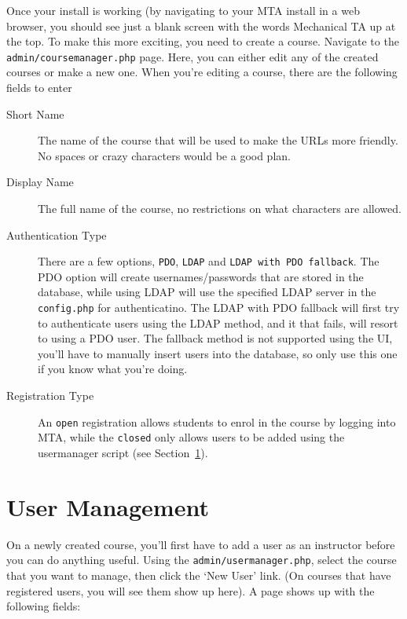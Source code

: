 \documentclass[11pt,letterpaper,oneside]{article}
\begin{document}
Once your install is working (by navigating to your MTA install in a web browser, you should see just a blank screen with the words Mechanical TA up at the top. To make this more exciting, you need to create a course. Navigate to the \texttt{admin/coursemanager.php} page. Here, you can either edit any of the created courses or make a new one. When you're editing a course,  there are the following fields to enter

\begin{description}
  \item [Short Name] The name of the course that will be used to make the URLs more friendly. No spaces or crazy characters would be a good plan.
  \item [Display Name] The full name of the course, no restrictions on what characters are allowed.
  \item [Authentication Type] There are a few options,  \texttt{PDO},  \texttt{LDAP} and \texttt{LDAP with PDO fallback}. The PDO option will create usernames/passwords that are stored in the database, while using LDAP will use the specified LDAP server in the \texttt{config.php} for authenticatino. The LDAP with PDO fallback will first try to authenticate users using the LDAP method, and it that fails, will resort to using a PDO user. The fallback method is not supported using the UI, you'll have to manually insert users into the database, so only use this one if you know what you're doing.
  \item [Registration Type] An \texttt{open} registration allows students to enrol in the course by logging into MTA, while the \texttt{closed} only allows users to be added using the usermanager script (see Section~\ref{users}).
\end{description}

\section{User Management}\label{users}

On a newly created course,  you'll first have to add a user as an instructor before you can do anything useful. Using the \texttt{admin/usermanager.php},  select the course that you want to manage, then click the `New User' link. (On courses that have registered users,  you will see them show up here). A page shows up with the following fields:
\end{document}
